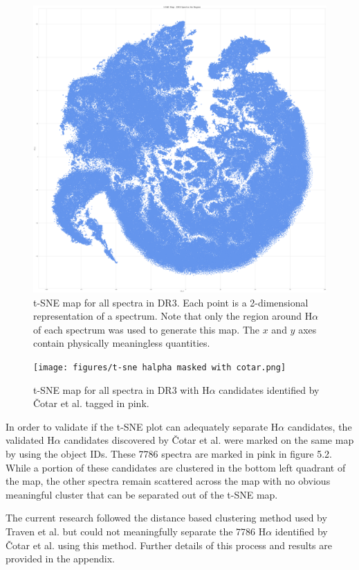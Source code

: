 \begin{figure}[h]
\centering
\includegraphics[scale=0.12]{figures/t-sne halpha masked.png}
\caption{t-SNE map for all spectra in DR3. Each point is a 2-dimensional representation of a spectrum. Note that only the region around H$\alpha$ of each spectrum was used to generate this map. The $x$ and $y$ axes contain physically meaningless quantities.}
\end{figure}

\begin{figure}[t]
\centering
\texttt{[image: figures/t-sne halpha masked with cotar.png]}
\caption{t-SNE map for all spectra in DR3 with H$\alpha$ candidates identified by Čotar et al. tagged in pink.}
\end{figure}

In order to validate if the t-SNE plot can adequately separate H$\alpha$ candidates, the validated H$\alpha$ candidates discovered by Čotar et al. \cite{vcotar2021galah} were marked on the same map by using the object IDs. These 7786 spectra are marked in pink in figure 5.2. While a portion of these candidates are clustered in the bottom left quadrant of the map, the other spectra remain scattered across the map with no obvious meaningful cluster that can be separated out of the t-SNE map. 

The current research followed the distance based clustering method used by Traven et al. but could not meaningfully separate the 7786 H$\alpha$ identified by Čotar et al. using this method. Further details of this process and results are provided in the appendix.

